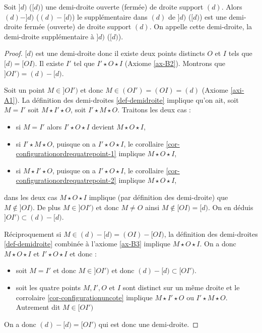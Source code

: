 \begin{prop}
    Soit $]d)$ ($[d)$) une demi-droite ouverte (fermée) de droite support $(d)$. Alors $(d)-]d)$ ($(d)-[d)$) le supplémentaire dans $(d)$ de $]d)$ ($[d)$) est une demi-droite fermée (ouverte) de droite support $(d)$. On appelle cette demi-droite, la demi-droite supplémentaire  à $]d)$ ($[d)$).

    \begin{proof}
        $[d)$ est une demi-droite donc il existe deux points distincts $O$ et $I$ tels que $[d)=[OI)$. Il existe $I'$ tel que $I' \star O \star I$ (Axiome \ref{ax-B2}). Montrons que $]OI') = (d)-[d)$.

        Soit un point $M\in ]OI')$ et donc $M\in (OI')=(OI)=(d)$ (Axiome \ref{axi-A1}). La définition des demi-droites \ref{def-demidroite} implique qu'on ait, soit $M=I'$ soit  $M\star I' \star O$, soit $I' \star M \star O$. Traitons les deux cas : 
        \begin{itemize}[$\bullet$]
            \item si $M=I'$ alors $I' \star O \star I$ devient $M\star O\star I$,
            \item si $I' \star M \star O$, puisque on a $I' \star O \star I$, le corollaire \ref{cor-configurationordrequatrepoint-1} implique $M\star O\star I$, 
            \item si $M \star I' \star  O$, puisque on a $I' \star O \star I$, le corollaire \ref{cor-configurationordrequatrepoint-2} implique $M\star O\star I$,
        \end{itemize}
        dans les deux cas $M\star O\star I$ implique (par définition des demi-droite) que $M \notin ]OI)$. De plus $M\in ]OI')$ et donc $M\neq O$ ainsi $M\notin [OI)=[d)$. On en déduis $]OI') \subset (d)-[d)$.

        Réciproquement si $M \in (d)-[d)=(OI)-[OI)$, la définition des demi-droites \ref{def-demidroite} combinée à l'axiome \ref{ax-B3} implique $M \star O \star I$. On a donc $M\star O\star I$ et $I'\star O \star I$ et donc :
        \begin{itemize}[$\bullet$]
            \item soit $M = I'$ et donc $M\in ]OI')$ et donc $(d)-[d) \subset [OI')$. 
            \item soit les quatre points $M,I',O $ et $I$ sont distinct sur un même droite et le corrolaire \ref{cor-configurationuncote} implique $M \star I' \star O$ ou $I'\star M\star O$. Autrement dit $M \in [OI')$ 
        \end{itemize}
        
        On a donc $(d)-[d) = [OI')$ qui est donc une demi-droite.
    \end{proof}
\end{prop}
